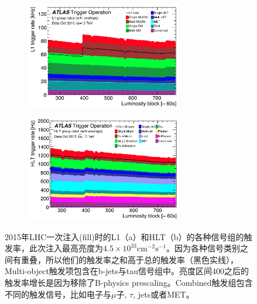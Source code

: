 \begin{figure}[h]
\begin{center}
\begin{subfigure}[b]{\textwidth}
\centering
   \includegraphics[width=0.75\textwidth]{fig/content_menu_figures_Time_L1GroupRate_Stack.png}
   \caption{}
  \label{fig:L1_menu_rates}
  \end{subfigure}
 \begin{subfigure}[b]{\textwidth}
 \centering
  \includegraphics[width=0.75\textwidth]{fig/content_menu_figures_Time_HLTGroupRate_Stack.png}
   \caption{}
   \label{fig:HLT_menu_rates}
  \end{subfigure}
\caption{2015年LHC一次注入(fill)时的L1（a）和HLT（b）的各种信号组的触发率，此次注入最高亮度为$4.5\times10^{33}\text{cm}^{-2}\text{s}^{-1}$。因为各种信号类别之间有重叠，所以他们的触发率之和高于总的触发率（黑色实线），Multi-object触发项包含在b-jets与tau信号组中。亮度区间400之后的触发率增长是因为移除了B-physics prescaling。Combined触发组包含不同的触发信号，比如电子与$\mu$子, $\tau$, jets或者MET。\cite{Aaboud2017}} \label{fig:Trigger_singlelepton}
\end{center}
\end{figure}
